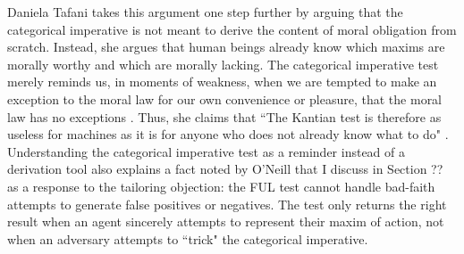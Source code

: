 \begin{isabellebody}
\begin{isamarkuptext}
Daniela Tafani takes this argument one step further by arguing that the categorical imperative is not meant
to derive the content of moral obligation from scratch. Instead, she argues that human beings already
know which maxims are morally worthy and which are morally lacking. The categorical imperative test
merely reminds us, in moments of weakness, when we are tempted to make an exception to the moral law for 
our own convenience or pleasure, that the moral law has no exceptions \citep[9]{tafani}. Thus, she claims
that ``The Kantian test is therefore as useless for machines as it is for anyone who does
not already know what to do" \citep[8]{tafani}. Understanding the categorical imperative test as a reminder
instead of a derivation tool also explains a fact noted by O'Neill that I discuss in Section ?? as a 
response to the tailoring objection: the FUL test cannot handle bad-faith attempts to generate false
positives or negatives. The test only returns the right result when an agent sincerely attempts to 
represent their maxim of action, not when an adversary attempts to ``trick" the categorical imperative.


\end{isamarkuptext}
\end{isabellebody}
